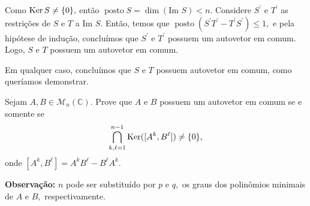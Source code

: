 \documentclass[11pt,a4paper]{article}
\begin{document}
{\begin{itemize}
Como $\operatorname{Ker} S \neq \{ 0 \},$ então $\operatorname{posto} S = \dim(\mbox{Im }S) < n.$ Considere $S^{\prime}$ e $T^{\prime}$ as restrições de $S$ e $T$ a $\mbox{Im }S.$ Então, temos que $\operatorname{posto}(S^{\prime}T^{\prime} - T^{\prime}S^{\prime}) \le 1,$ e pela hipótese de indução, concluímos que $S^{\prime}$ e $T^{\prime}$ possuem um autovetor em comum. Logo, $S$ e $T$ possuem um autovetor em comum.
\end{itemize}

Em qualquer caso, concluímos que $S$ e $T$ possuem autovetor em comum, como queríamos demonstrar.
}

\begin{exercicio}
Sejam $A, B \in \mathcal{M}_n(\mathbb{C}).$ Prove que $A$ e $B$ possuem um autovetor em comum se e somente se
\[
\bigcap\limits_{k, \ell = 1}^{n - 1} \operatorname{Ker}([A^k, B^\ell]) \neq \{ 0 \},
\]
onde $[A^k, B^{\ell}] = A^kB^\ell - B^\ell A^k.$

\textbf{Observação:} $n$ pode ser substituído por $p$ e $q,$ os graus dos polinômios minimais de $A$ e $B,$ respectivamente.
\end{exercicio}
\end{document}

